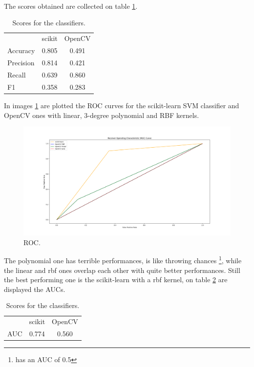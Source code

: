 The scores obtained are collected on table \ref{tab:scores}.

\begin{table}[h!t]
    \centering
    \caption{Scores for the classifiers.}
    \label{tab:scores}
    \begin{tabular}{lcc}
        & scikit & OpenCV \\
        Accuracy & 0.805 & 0.491 \\
        Precision & 0.814 & 0.421 \\
        Recall & 0.639 & 0.860 \\
        F1 & 0.358 & 0.283 \\
    \end{tabular}
\end{table}

In images \ref{fig:roc} are plotted the ROC curves for the scikit-learn SVM classifier and OpenCV ones with linear, 3-degree polynomial and RBF kernels. 

\begin{figure}[h!t]
    \centering
    \includegraphics[scale=0.25]{images/roc.png}
    \caption{ROC.}
    \label{fig:roc}
\end{figure}

The polynomial one has terrible performances, is like throwing chances \footnote{has an AUC of 0.5}, while the linear and rbf ones overlap each other with quite better performances.
Still the best performing one is the scikit-learn with a rbf kernel, on table \ref{tab:auc} are displayed the AUCs.

\begin{table}[h!t]
    \centering
    \caption{Scores for the classifiers.}
    \label{tab:auc}
    \begin{tabular}{lcc}
        & scikit & OpenCV \\
        AUC & 0.774 & 0.560 \\
    \end{tabular}
\end{table}

